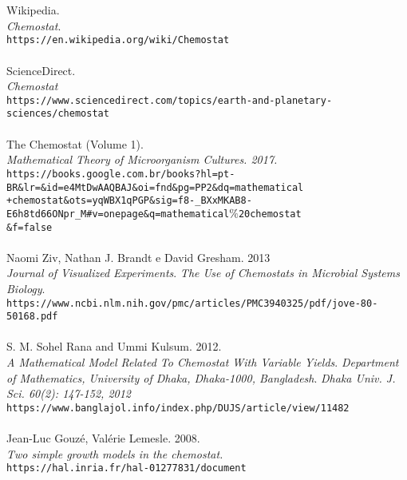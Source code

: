 \documentclass{article}
\begin{document}
\newpage
\begin{thebibliography}{9}
\\\\
Wikipedia. 
\\
\textit{Chemostat}. 
\\\texttt{https://en.wikipedia.org/wiki/Chemostat}
\\\\
ScienceDirect.
\\
\textit{Chemostat}
\\\texttt{https://www.sciencedirect.com/topics/earth-and-planetary-sciences/chemostat}
\\\\
The Chemostat (Volume 1).
\\
\textit{Mathematical Theory of Microorganism Cultures. 2017.}
\\\texttt{https://books.google.com.br/books?hl=pt-BR\&lr=\&id=e4MtDwAAQBAJ\&oi=fnd\&pg=PP2\&dq=mathematical
\\+chemostat\&ots=yqWBX1qPGP\&sig=f8-\_BXxMKAB8-E6h8td66ONpr\_M\#v=onepage\&q=mathematical$\%$20chemostat
\\ \&f=false}
\\\\
Naomi Ziv, Nathan J. Brandt e David Gresham. 2013
\\
\textit{Journal of Visualized Experiments}.
\textit{The Use of Chemostats in Microbial Systems Biology}.
\\\texttt{https://www.ncbi.nlm.nih.gov/pmc/articles/PMC3940325/pdf/jove-80-50168.pdf}
\\\\
S. M. Sohel Rana and Ummi Kulsum. 2012.
\\
\textit{A Mathematical Model Related To Chemostat With Variable Yields}.
\textit{Department of Mathematics, University of Dhaka, Dhaka-1000, Bangladesh}.
\textit{Dhaka Univ. J. Sci. 60(2): 147-152, 2012}
\\\texttt{https://www.banglajol.info/index.php/DUJS/article/view/11482}
\\\\
Jean-Luc Gouzé, Valérie Lemesle. 2008.
\\
\textit{Two simple growth models in the chemostat.}
\\\texttt{https://hal.inria.fr/hal-01277831/document}
\\\\

\end{thebibliography}
\end{document}
